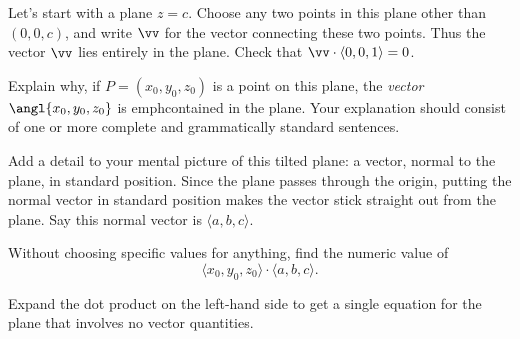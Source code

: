 \documentclass[12pt]{exam}
\begin{document}
\begin{questions}

\question Let's start with a plane $z = c$. Choose any two points in this plane
other than $(0,0,c)$, and write $\vv$ for the vector connecting these two
points. Thus the vector $\vv$ lies entirely in the plane. Check that $\vv \cdot
\langle 0, 0, 1 \rangle = 0$.


\question Explain why, if $P = (x_0, y_0, z_0)$ is a point on this plane, the
\emph{vector} $\angl{x_0, y_0, z_0}$ is emph{contained} in the plane.
Your explanation should consist of one or more complete and grammatically
standard sentences.

\question Add a detail to your mental picture of this tilted plane: a vector,
normal to the plane, in standard position. Since the plane passes through the
origin, putting the normal vector in standard position makes the vector stick
straight out from the plane. Say this normal vector is $\langle a, b, c
\rangle$.

\question  Without choosing specific values for anything, find the numeric value
of 
\begin{equation*}
    \langle x_0, y_0, z_0 \rangle \cdot \langle a, b, c \rangle.
\end{equation*}

\question Expand the dot product on the left-hand side to get a single equation
for the plane that involves no vector quantities.



\end{questions}
\end{document}
